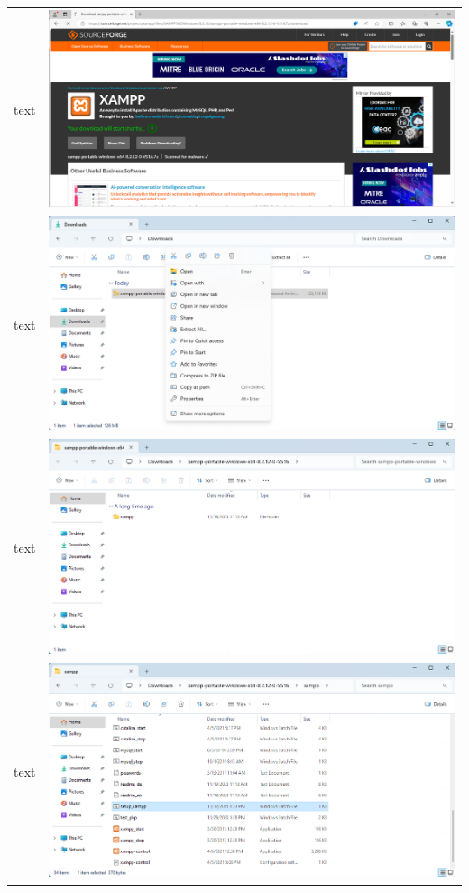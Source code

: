 \documentclass[11pt,a4paper]{report}
\begin{document}
\begin{tabular}{ l r }
            text & \includegraphics[scale=1.0]{xampp05} \\
            text & \includegraphics[scale=1.0]{xampp06} \\
            text & \includegraphics[scale=1.0]{xampp07} \\
            text & \includegraphics[scale=1.0]{xampp08} \\

\end{tabular}
\end{document}
